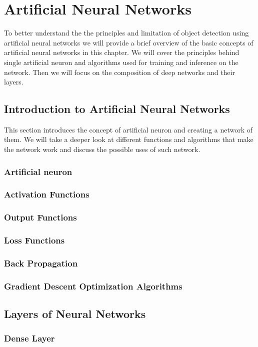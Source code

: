 \chapter{Artificial Neural Networks}
\label{chapt:nnets}
To better understand the the principles and limitation of object detection using artificial neural networks we will provide a brief overview of the basic concepts of artificial neural networks in this chapter. We will cover the principles behind single artificial neuron and algorithms used for training and inference on the network. Then we will focus on the composition of deep networks and their layers.

\section{Introduction to Artificial Neural Networks}
This section introduces the concept of artificial neuron and creating a network of them. We will take a deeper look at different functions and algorithms that make the network work and discuss the possible uses of such network.

\subsection{Artificial neuron}
\cite{bib:dlbook}
\subsection{Activation Functions}
\subsection{Output Functions}
\subsection{Loss Functions}
\subsection{Back Propagation}
\subsection{Gradient Descent Optimization Algorithms}

\section{Layers of Neural Networks}
\subsection{Dense Layer}
